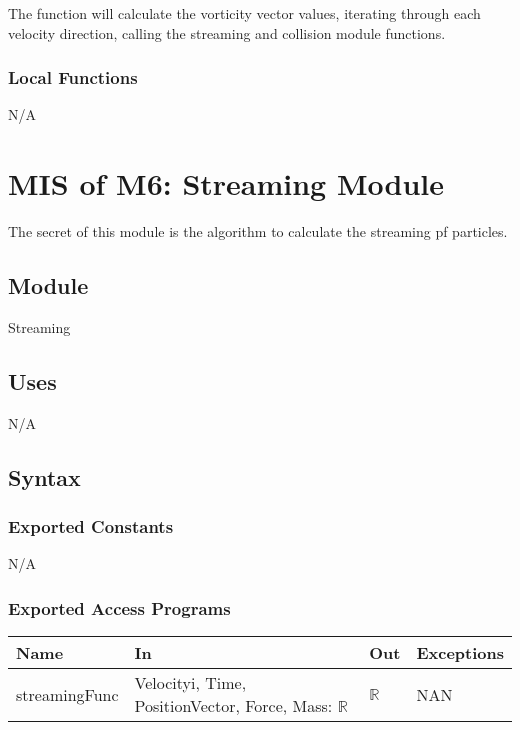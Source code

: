 \documentclass[12pt, titlepage]{article}
\begin{document}
The function will calculate the vorticity vector values, iterating through each velocity direction, calling the streaming and collision module functions.

\subsubsection{Local Functions}

N/A

\newpage

\section{MIS of M6: Streaming Module} \label{STModule}

The secret of this module is the algorithm to calculate the streaming pf particles.

\subsection{Module}

Streaming

\subsection{Uses}
N/A
\subsection{Syntax}

\subsubsection{Exported Constants}
N/A

\subsubsection{Exported Access Programs}

\begin{center}
	\begin{tabular}{p{3cm} p{3cm} p{3cm} p{2cm}}
		\hline
		\textbf{Name} & \textbf{In} & \textbf{Out} & \textbf{Exceptions} \\
		\hline
		streamingFunc & Velocityi, Time, PositionVector, Force, Mass: $\mathbb{R}$ & $\mathbb{R}$ & NAN \\
		\hline
	\end{tabular}
\end{center}
\end{document}
